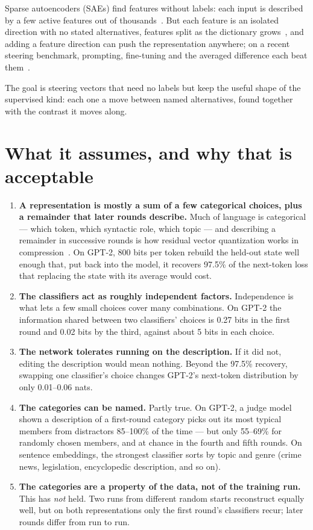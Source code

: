 \documentclass[11pt]{article}
\begin{document}
Sparse autoencoders (SAEs) find features without labels: each input is
described by a few active features out of thousands~\cite{bricken2023,
gao2024}. But each feature is an isolated direction with no stated
alternatives, features split as the dictionary grows~\cite{bussmann2025},
and adding a feature direction can push the representation anywhere; on a
recent steering benchmark, prompting, fine-tuning and the averaged
difference each beat them~\cite{wu2025axbenchsteeringllmssimple}.

The goal is steering vectors that need no labels but keep the useful shape
of the supervised kind: each one a move between named alternatives, found
together with the contrast it moves along.

\section*{What it assumes, and why that is acceptable}

\begin{enumerate}
\item \textbf{A representation is mostly a sum of a few categorical
choices, plus a remainder that later rounds describe.} Much of language is
categorical --- which token, which syntactic role, which topic --- and
describing a remainder in successive rounds is how residual vector
quantization works in compression~\cite{zeghidour2021}. On GPT-2, 800 bits
per token rebuild the held-out state well enough that, put back into the
model, it recovers 97.5\% of the next-token loss that replacing the state
with its average would cost.
\item \textbf{The classifiers act as roughly independent factors.}
Independence is what lets a few small choices cover many combinations. On
GPT-2 the information shared between two classifiers' choices is 0.27 bits
in the first round and 0.02 bits by the third, against about 5 bits in
each choice.
\item \textbf{The network tolerates running on the description.} If it did
not, editing the description would mean nothing. Beyond the 97.5\%
recovery, swapping one classifier's choice changes GPT-2's next-token
distribution by only 0.01--0.06 nats.
\item \textbf{The categories can be named.} Partly true. On GPT-2, a judge
model shown a description of a first-round category picks out its most
typical members from distractors 85--100\% of the time --- but only 55--69\%
for randomly chosen members, and at chance in the fourth and fifth rounds.
On sentence embeddings, the strongest classifier sorts by topic and genre
(crime news, legislation, encyclopedic description, and so on).
\item \textbf{The categories are a property of the data, not of the
training run.} This has \emph{not} held. Two runs from different random
starts reconstruct equally well, but on both representations only the
first round's classifiers recur; later rounds differ from run to run.
\end{enumerate}
\end{document}
